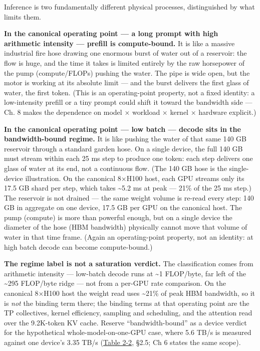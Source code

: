 \label{mental-model}


Inference is two fundamentally different physical processes,
distinguished by what limits them.

\textbf{In the canonical operating point --- a long prompt with high
arithmetic intensity --- prefill is compute-bound.} It is like a massive
industrial fire hose drawing one enormous burst of water out of a
reservoir: the flow is huge, and the time it takes is limited entirely
by the raw horsepower of the pump (compute/FLOPs) pushing the water. The
pipe is wide open, but the motor is working at its absolute limit ---
and the burst delivers the first glass of water, the first token. (This
is an operating-point property, not a fixed identity: a low-intensity
prefill or a tiny prompt could shift it toward the bandwidth side ---
Ch. 8 makes the dependence on model × workload × kernel × hardware
explicit.)

\textbf{In the canonical operating point --- low batch --- decode sits
in the bandwidth-bound regime.} It is like pushing the water of that
same 140 GB reservoir through a standard garden hose. On a single
device, the full 140 GB must stream within each 25 ms step to produce
one token: each step delivers one glass of water at its end, not a
continuous flow. (The 140 GB hose is the single-device illustration. On
the canonical 8×H100 host, each GPU streams only its 17.5 GB shard per
step, which takes \textasciitilde5.2 ms at peak --- 21\% of the 25 ms
step.) The reservoir is not drained --- the same weight volume is
re-read every step: 140 GB in aggregate on one device, 17.5 GB per GPU
on the canonical host. The pump (compute) is more than powerful enough,
but on a single device the diameter of the hose (HBM bandwidth)
physically cannot move that volume of water in that time frame. (Again
an operating-point property, not an identity: at high batch decode can
become compute-bound.)

\textbf{The regime label is not a saturation verdict.} The
classification comes from arithmetic intensity --- low-batch decode runs
at \textasciitilde1 FLOP/byte, far left of the \textasciitilde295
FLOP/byte ridge --- not from a per-GPU rate comparison. On the canonical
8×H100 host the weight read uses \textasciitilde21\% of peak HBM
bandwidth, so it is \emph{not} the binding term there; the binding terms
at that operating point are the TP collectives, kernel efficiency,
sampling and scheduling, and the attention read over the 9.2K-token KV
cache. Reserve ``bandwidth-bound'' as a device verdict for the
hypothetical whole-model-on-one-GPU case, where 5.6 TB/s is measured
against one device's 3.35 TB/s (\hyperref[tab:2.2]{Table 2-2}, §2.5; Ch 6 states the same
scope).

